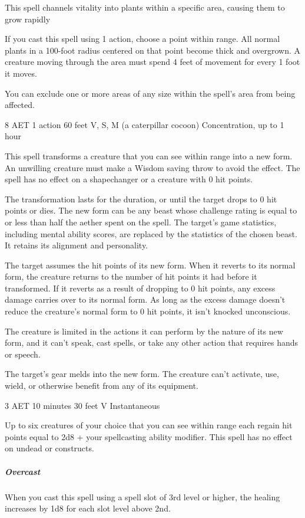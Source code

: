 This spell channels vitality into plants within a specific area, causing them to grow rapidly

If you cast this spell using 1 action, choose a point within range. All normal plants in a 100-foot radius centered on that point become thick and overgrown. A creature moving through the area must spend 4 feet of movement for every 1 foot it moves.

You can exclude one or more areas of any size within the spell's area from being affected.

\label{spell:polymorph}
{8 AET}
{1 action}
{60 feet}
{V, S, M (a caterpillar cocoon)}
{Concentration, up to 1 hour}

This spell transforms a creature that you can see within range into a new form. An unwilling creature must make a Wisdom saving throw to avoid the effect. The spell has no effect on a shapechanger or a creature with 0 hit points.

The transformation lasts for the duration, or until the target drops to 0 hit points or dies. The new form can be any beast whose challenge rating is equal to or less than half the aether spent on the spell. The target's game statistics, including mental ability scores, are replaced by the statistics of the chosen beast. It retains its alignment and personality.

The target assumes the hit points of its new form. When it reverts to its normal form, the creature returns to the number of hit points it had before it transformed. If it reverts as a result of dropping to 0 hit points, any excess damage carries over to its normal form. As long as the excess damage doesn't reduce the creature's normal form to 0 hit points, it isn't knocked unconscious.

The creature is limited in the actions it can perform by the nature of its new form, and it can't speak, cast spells, or take any other action that requires hands or speech.

The target's gear melds into the new form. The creature can't activate, use, wield, or otherwise benefit from any of its equipment.

\label{spell:prayer-of-healing}
{3 AET}
{10 minutes}
{30 feet}
{V}
{Instantaneous}

Up to six creatures of your choice that you can see within range each regain hit points equal to 2d8 + your spellcasting ability modifier. This spell has no effect on undead or constructs.
\subparagraph*{Overcast} When you cast this spell using a spell slot of 3rd level or higher, the healing increases by 1d8 for each slot level above 2nd.

